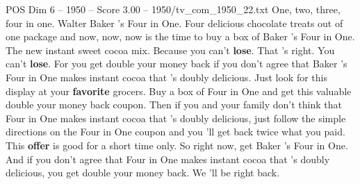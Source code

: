 \begin{textsample}{POS Dim 6 – 1950 – Score 3.00 – 1950/tv\_com\_1950\_22.txt}  \label{ex:f6_pos_005}
One, two, three, four in one.
Walter Baker 's Four in One.
Four delicious chocolate treats out of one package and now, now, now is the time to buy a box of Baker 's Four in One.
The new instant sweet cocoa mix.
Because you can't \textbf{lose}.
That 's right.
You can't \textbf{lose}.
For you get double your money back if you don't agree that Baker 's Four in One makes instant cocoa that 's doubly delicious.
Just look for this display at your \textbf{favorite} grocers.
Buy a box of Four in One and get this valuable double your money back coupon.
Then if you and your family don't think that Four in One makes instant cocoa that 's doubly delicious, just follow the simple directions on the Four in One coupon and you 'll get back twice what you paid.
This \textbf{offer} is good for a short time only.
So right now, get Baker 's Four in One.
And if you don't agree that Four in One makes instant cocoa that 's doubly delicious, you get double your money back.
We 'll be right back.

\end{textsample}
